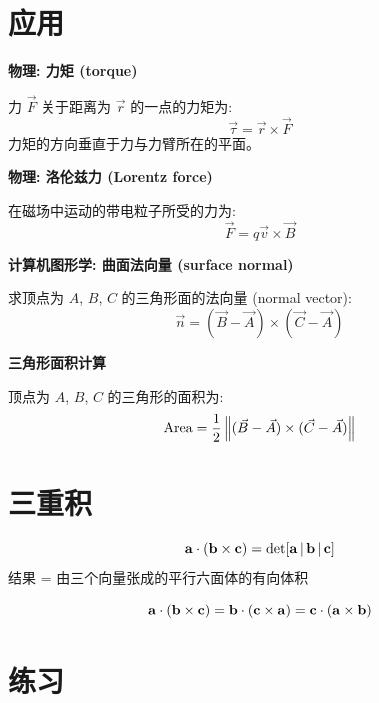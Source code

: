 \section{应用}

\begin{practical}
\textbf{物理: 力矩 (torque)}

力 $\vec{F}$ 关于距离为 $\vec{r}$ 的一点的力矩为:
\[
\vec{\tau} = \vec{r} \times \vec{F}
\]
力矩的方向垂直于力与力臂所在的平面。
\end{practical}

\begin{practical}
\textbf{物理: 洛伦兹力 (Lorentz force)}

在磁场中运动的带电粒子所受的力为:
\[
\vec{F} = q\vec{v} \times \vec{B}
\]
\end{practical}

\begin{practical}
\textbf{计算机图形学: 曲面法向量 (surface normal)}

求顶点为 $A$, $B$, $C$ 的三角形面的法向量 (normal vector):
\[
\vec{n} = (\vec{B} - \vec{A}) \times (\vec{C} - \vec{A})
\]
\end{practical}

\begin{practical}
\textbf{三角形面积计算}

顶点为 $A$, $B$, $C$ 的三角形的面积为:
\[
\text{Area} = \frac{1}{2}\left\| (\vec{B}-\vec{A}) \times (\vec{C}-\vec{A}) \right\|
\]
\end{practical}

\section{三重积}

\begin{definition}
\[
\mathbf{a} \cdot (\mathbf{b} \times \mathbf{c}) = \det[\mathbf{a} \,|\, \mathbf{b} \,|\, \mathbf{c}]
\]
结果 = 由三个向量张成的平行六面体的有向体积
\end{definition}

\begin{theorem}[轮换性质]
\[
\mathbf{a} \cdot (\mathbf{b} \times \mathbf{c}) = \mathbf{b} \cdot (\mathbf{c} \times \mathbf{a}) = \mathbf{c} \cdot (\mathbf{a} \times \mathbf{b})
\]
\end{theorem}

\section{练习}

